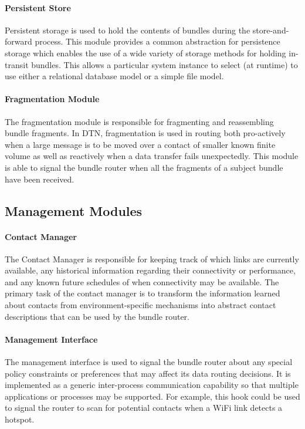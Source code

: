 \paragraph{Persistent Store}
Persistent storage is used to hold the contents of bundles during the store-and-forward process. This module provides a common abstraction for persistence storage which enables the use of a wide variety of storage methods for holding in-transit bundles. This allows a particular system instance to select (at runtime) to use either a relational database model or a simple file model.

\paragraph{Fragmentation Module}
The fragmentation module is responsible for fragmenting and reassembling bundle fragments. In DTN, fragmentation is used in routing both pro-actively when a large message is to be moved over a contact of smaller known finite volume as well as reactively when a data transfer fails unexpectedly. This module is able to signal the bundle router when all the fragments of a subject bundle have been received. 

\subsection{Management Modules}

\paragraph{Contact Manager}
The Contact Manager is responsible for keeping track of which links are currently available, any historical information regarding their connectivity or performance, and any known future schedules of when connectivity may be available. The primary task of the contact manager is to transform the information learned about contacts from environment-specific mechanisms into abstract contact descriptions that can be used by the bundle router.

\paragraph{Management Interface}
The management interface is used to signal the bundle router about any special policy constraints or preferences that may affect its data routing decisions. It is implemented as a generic inter-process communication capability so that multiple applications or processes may be supported. For example, this hook could be used to signal the router to scan for potential contacts when a WiFi link detects a hotspot.

